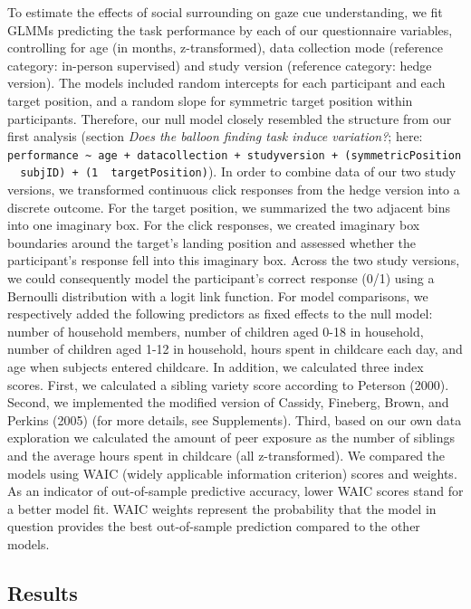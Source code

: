 \documentclass[
  man,floatsintext]{apa6}
\begin{document}
To estimate the effects of social surrounding on gaze cue understanding, we fit GLMMs predicting the task performance by each of our questionnaire variables, controlling for age (in months, z-transformed), data collection mode (reference category: in-person supervised) and study version (reference category: hedge version). The models included random intercepts for each participant and each target position, and a random slope for symmetric target position within participants. Therefore, our null model closely resembled the structure from our first analysis (section \emph{Does the balloon finding task induce variation?}; here: \texttt{performance\ \textasciitilde{}\ age\ +\ datacollection\ +\ studyversion\ +\ (symmetricPosition\ \textbar{}\ subjID)\ +\ (1\ \textbar{}\ targetPosition)}).
In order to combine data of our two study versions, we transformed continuous click responses from the hedge version into a discrete outcome. For the target position, we summarized the two adjacent bins into one imaginary box. For the click responses, we created imaginary box boundaries around the target's landing position and assessed whether the participant's response fell into this imaginary box. Across the two study versions, we could consequently model the participant's correct response (0/1) using a Bernoulli distribution with a logit link function.
For model comparisons, we respectively added the following predictors as fixed effects to the null model: number of household members, number of children aged 0-18 in household, number of children aged 1-12 in household, hours spent in childcare each day, and age when subjects entered childcare.
In addition, we calculated three index scores. First, we calculated a sibling variety score according to Peterson (2000). Second, we implemented the modified version of Cassidy, Fineberg, Brown, and Perkins (2005) (for more details, see Supplements). Third, based on our own data exploration we calculated the amount of peer exposure as the number of siblings and the average hours spent in childcare (all z-transformed).
We compared the models using WAIC (widely applicable information criterion) scores and weights. As an indicator of out-of-sample predictive accuracy, lower WAIC scores stand for a better model fit. WAIC weights represent the probability that the model in question provides the best out-of-sample prediction compared to the other models.

\hypertarget{results-2}{%
\subsection{Results}\label{results-2}}
\end{document}
